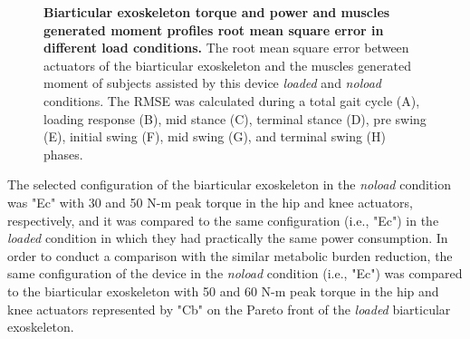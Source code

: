 \documentclass[10pt,letterpaper]{article}
\begin{document}
\begin{figure}[ht!]
	\centering
	\hfil
	\vspace{1mm}
	\caption{\small{\textbf{Biarticular exoskeleton torque and power and muscles generated moment profiles root mean square error in different load conditions.} The root mean square error between actuators of the biarticular exoskeleton and the muscles generated moment of subjects assisted by this device {\it loaded} and {\it noload} conditions. The RMSE was calculated during a total gait cycle (A), loading response (B), mid stance (C), terminal stance (D), pre swing (E), initial swing (F), mid swing (G), and terminal swing (H) phases.}}
	\label{Fig_Case03_RMSE}
\end{figure}
The selected configuration of the biarticular exoskeleton in the {\it noload} condition was "Ec" with 30 and 50 N-m peak torque in the hip and knee actuators, respectively, and it was compared to the same configuration (i.e., "Ec") in the {\it loaded} condition in which they had practically the same power consumption. In order to conduct a comparison with the similar metabolic burden reduction, the same configuration of the device in the {\it noload} condition (i.e., "Ec") was compared to the biarticular exoskeleton with 50 and 60 N-m peak torque in the hip and knee actuators represented by "Cb" on the Pareto front of the {\it loaded} biarticular exoskeleton.\\
\end{document}
